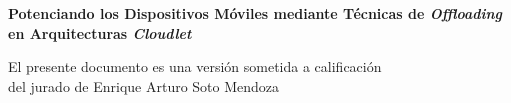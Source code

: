 \documentclass[12pt, a4paper, oneside]{Thesis} %
\begin{document}
\begin{comment}



\clearpage %

\lhead{\emph{Physical Constants}} %

\listofconstants{lrcl} %
{
Speed of Light & $c$ & $=$ & $2.997\ 924\ 58\times10^{8}\ \mbox{ms}^{-\mbox{s}}$ (exact)\\
}


\clearpage %

\lhead{\emph{Symbols}} %

\listofnomenclature{lll} %
{
$a$ & distance & m \\
$P$ & power & W (Js$^{-1}$) \\

& & \\ %

$\omega$ & angular frequency & rads$^{-1}$ \\
}
 
\end{comment}

\vspace*{2cm}

\begin{center}
 \Large \textbf{Potenciando los Dispositivos Móviles mediante Técnicas de \emph{Offloading} en Arquitecturas \textit{Cloudlet}}
\end{center}
 

\vspace{5cm}
\begin{minipage}{0.9\textwidth}
\begin{flushright} \large
El presente documento es una versión sometida a calificación \\ del jurado de Enrique Arturo Soto Mendoza
\end{flushright}
\end{minipage} %
\end{document}
